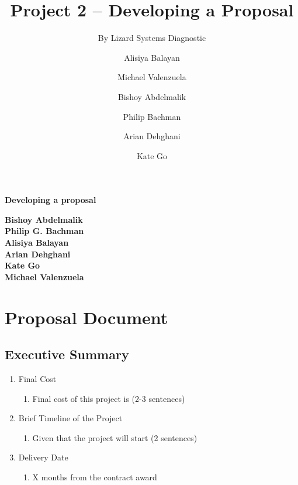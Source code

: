 \documentclass{article}
\title{Project 2 – Developing a Proposal}
\author{
  By Lizard Systems Diagnostic\and
  Alisiya Balayan\and
  Michael Valenzuela\and
  Bishoy Abdelmalik\and
  Philip Bachman\and
  Arian Dehghani\and
  Kate Go
}
\begin{document}
\begin{titlepage}
    \begin{center}
        \vspace*{1cm}
            
        \Huge
        \textbf{Developing a proposal}
            
            

        \vspace{5cm}
        
        \Large
        \textbf{Bishoy Abdelmalik}\\
        \textbf{Philip G. Bachman}\\
        \textbf{Alisiya Balayan}\\
        \textbf{Arian Dehghani}\\
        \textbf{Kate Go}\\
        \textbf{Michael Valenzuela}

        \vspace{7cm}

            

                        
        \vspace{0.8cm}
            
        \Large
        
            
    \end{center}
\end{titlepage}

\pagebreak
\tableofcontents
\pagebreak

\section{Proposal Document}
\subsection{Executive Summary}
\begin{enumerate}
\item Final Cost
  \begin{enumerate}
  \item Final cost of this project is (2-3 sentences)
  \end{enumerate}
\item Brief Timeline of the Project
  \begin{enumerate}
  \item Given that the project will start (2 sentences)
  \end{enumerate}
\item Delivery Date
  \begin{enumerate}
  \item X months from the contract award
  \end{enumerate}
\end{enumerate}
\end{document}
